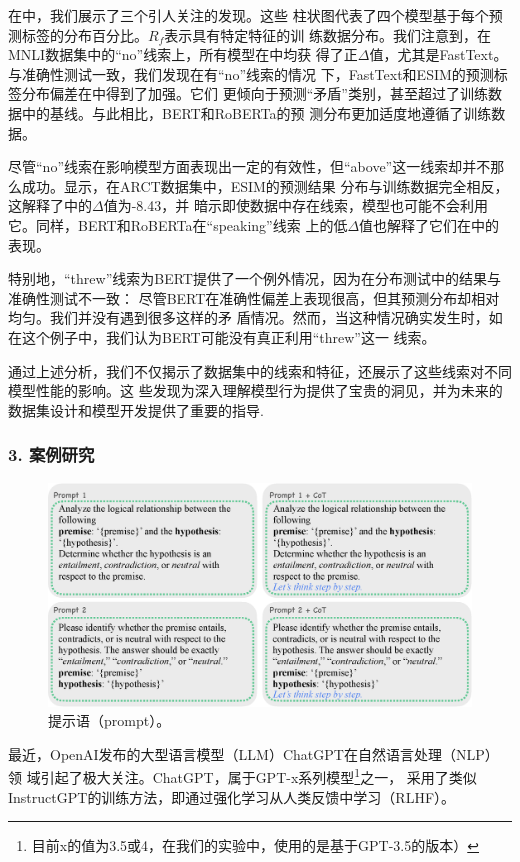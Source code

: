 在中，我们展示了三个引人关注的发现。这些
柱状图代表了四个模型基于每个预测标签的分布百分比。$R_f$表示具有特定特征的训
练数据分布。我们注意到，在MNLI数据集中的``no''线索上，所有模型在中均获
得了正$\Delta$值，尤其是FastText。与准确性测试一致，我们发现在有``no''线索的情况
下，FastText和ESIM的预测标签分布偏差在中得到了加强。它们
更倾向于预测``矛盾''类别，甚至超过了训练数据中的基线。与此相比，BERT和RoBERTa的预
测分布更加适度地遵循了训练数据。

尽管``no''线索在影响模型方面表现出一定的有效性，但``above''这一线索却并不那
么成功。显示，在ARCT数据集中，ESIM的预测结果
分布与训练数据完全相反，这解释了中的$\Delta$值为-8.43，并
暗示即使数据中存在线索，模型也可能不会利用它。同样，BERT和RoBERTa在``speaking''线索
上的低$\Delta$值也解释了它们在中的表现。

特别地，``threw''线索为BERT提供了一个例外情况，因为在分布测试中的结果与准确性测试不一致：
尽管BERT在准确性偏差上表现很高，但其预测分布却相对均匀。我们并没有遇到很多这样的矛
盾情况。然而，当这种情况确实发生时，如在这个例子中，我们认为BERT可能没有真正利用``threw''这一
线索。

通过上述分析，我们不仅揭示了数据集中的线索和特征，还展示了这些线索对不同模型性能的影响。这
些发现为深入理解模型行为提供了宝贵的洞见，并为未来的数据集设计和模型开发提供了重要的指导.

\subsubsection*{3. 案例研究}
\label{sec4:mitigatingbiases}
\begin{figure}[th]
\centering
\includegraphics[width=0.9\columnwidth]{figures/emnlp/prompt.eps}
\caption{提示语（prompt）。}
\label{fig4:prompt}
\end{figure}
最近，OpenAI发布的大型语言模型（LLM）ChatGPT在自然语言处理（NLP）领
域引起了极大关注。ChatGPT，属于GPT-x系列模型\footnote{目前x的值为3.5或4，在我们的实验中，使用的是基于GPT-3.5的版本）}之一，
采用了类似InstructGPT\cite{ouyang2022training}的训练方法，即通过强化学习从人类反馈中学习（RLHF）。

